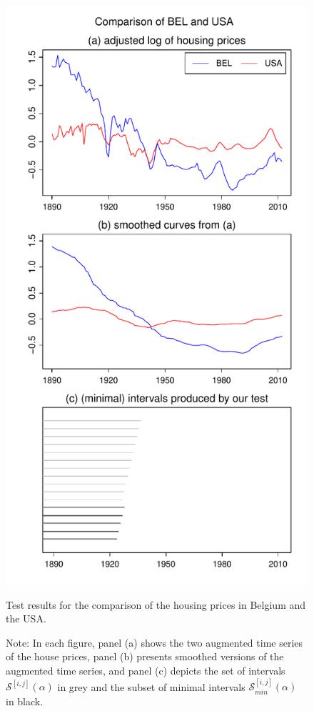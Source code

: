 \documentclass[a4paper,12pt]{article}
\begin{document}
\begin{figure}[p!]
\hspace{0.25cm}
\begin{minipage}[t]{0.49\textwidth}
\includegraphics[width=\textwidth]{Plots/hp_BEL_vs_USA}
\caption{Test results for the comparison of the housing prices in Belgium and the USA.}\label{fig:hp:Belgium:USA}
\end{minipage}
\caption*{Note: In each figure, panel (a) shows the two augmented time series of the house prices, panel (b) presents smoothed versions of the augmented time series, and panel (c) depicts the set of intervals $\mathcal{S}^{[i,j]}(\alpha)$ in grey and the subset of minimal intervals $\mathcal{S}^{[i,j]}_{min}(\alpha)$ in black.}
\end{figure}
\end{document}

